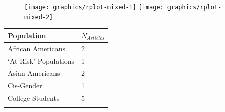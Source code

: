 \documentclass[]{tufte-handout}
\begin{document}
\begin{figure}
\texttt{[image: graphics/rplot-mixed-1]} \texttt{[image: graphics/rplot-mixed-2]} \end{figure}

\newpage


\begin{longtable}[]{@{}ll@{}}
\toprule
\begin{minipage}[b]{0.59\columnwidth}\raggedright\strut
Population\strut
\end{minipage} & \begin{minipage}[b]{0.21\columnwidth}\raggedright\strut
\(N_{Articles}\)\strut
\end{minipage}\tabularnewline
\midrule
\endhead
\begin{minipage}[t]{0.59\columnwidth}\raggedright\strut
African Americans\strut
\end{minipage} & \begin{minipage}[t]{0.21\columnwidth}\raggedright\strut
2\strut
\end{minipage}\tabularnewline
\begin{minipage}[t]{0.59\columnwidth}\raggedright\strut
`At Risk' Populations\strut
\end{minipage} & \begin{minipage}[t]{0.21\columnwidth}\raggedright\strut
1\strut
\end{minipage}\tabularnewline
\begin{minipage}[t]{0.59\columnwidth}\raggedright\strut
Asian Americans\strut
\end{minipage} & \begin{minipage}[t]{0.21\columnwidth}\raggedright\strut
2\strut
\end{minipage}\tabularnewline
\begin{minipage}[t]{0.59\columnwidth}\raggedright\strut
Cis-Gender\strut
\end{minipage} & \begin{minipage}[t]{0.21\columnwidth}\raggedright\strut
1\strut
\end{minipage}\tabularnewline
\begin{minipage}[t]{0.59\columnwidth}\raggedright\strut
College Students\strut
\end{minipage} & \begin{minipage}[t]{0.21\columnwidth}\raggedright\strut
5\strut
\end{minipage}\tabularnewline
\begin{minipage}[t]{0.59\columnwidth}\raggedright\strut

\end{minipage}
\end{longtable}
\end{document}
